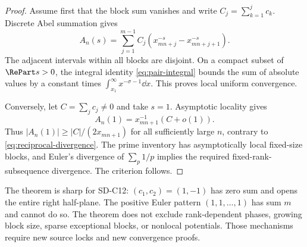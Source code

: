 \begin{proof}
Assume first that the block sum vanishes and write
$C_j=\sum_{k=1}^j c_k$.  Discrete Abel summation gives
\[
 A_n(s)=\sum_{j=1}^{m-1}C_j
 \left(x_{mn+j}^{-s}-x_{mn+j+1}^{-s}\right).   \tag{6.7}
\]
The adjacent intervals within all blocks are disjoint.  On a compact subset
of $\RePart s>0$, the integral identity \eqref{eq:pair-integral} bounds the
sum of absolute values by a constant times
$\int_{x_1}^{\infty}x^{-\sigma-1}\dd x$.  This proves local uniform
convergence.

Conversely, let $C=\sum_jc_j\ne0$ and take $s=1$.  Asymptotic locality gives
\[
 A_n(1)=x_{mn+1}^{-1}(C+o(1)).                  \tag{6.8}
\]
Thus $|A_n(1)|\ge |C|/(2x_{mn+1})$ for all sufficiently large $n$, contrary
to \eqref{eq:reciprocal-divergence}.  The prime inventory has asymptotically
local fixed-size blocks, and Euler's divergence of $\sum_p1/p$ implies the
required fixed-rank-subsequence divergence.  The criterion follows.
\end{proof}

The theorem is sharp for SD-C12: $(c_1,c_2)=(1,-1)$ has zero sum and opens
the entire right half-plane.  The positive Euler pattern
$(1,1,\ldots,1)$ has sum $m$ and cannot do so.  The theorem does not exclude
rank-dependent phases, growing block size, sparse exceptional blocks, or
nonlocal potentials.  Those mechanisms require new source locks and new
convergence proofs.
